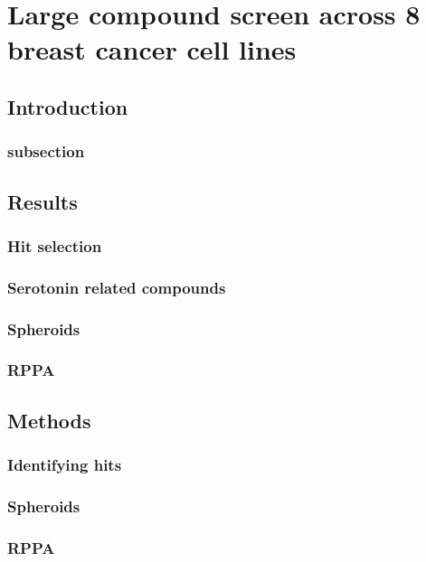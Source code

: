 \documentclass[a4paper,11pt,twoside,openright]{scrbook}
\begin{document}
\chapter{Large compound screen across 8 breast cancer cell lines} \label{chapter:screen}




\section{Introduction}

\subsection{subsection}



\section{Results}

\subsection{Hit selection}

\subsection{Serotonin related compounds}

\subsection{Spheroids}

\subsection{RPPA}


\section{Methods}

\subsection{Identifying hits}

\subsection{Spheroids}

\subsection{RPPA}

\end{document}
